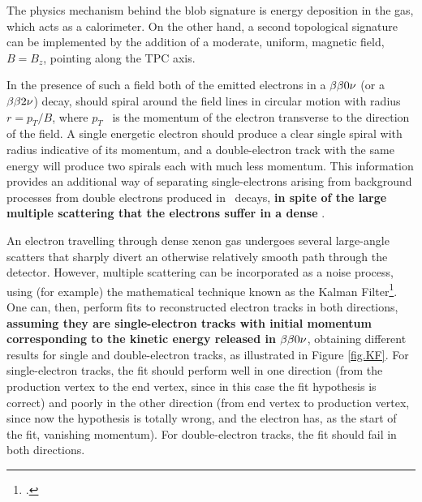 The physics mechanism behind the blob signature is energy deposition in the gas, which acts as a calorimeter. On the other hand, a second topological signature can be implemented by the addition of a moderate, uniform, magnetic field, $B= B_z$, pointing along the TPC axis. 

In the presence of such a field both of the emitted electrons in a $\beta\beta0\nu$ (or a $\beta\beta2\nu$) decay, should spiral around the field lines in circular motion with radius $r = p_T/B$, where $p_T$~ is the momentum of the electron transverse to the direction of the field. A single energetic electron should produce a clear single spiral with radius indicative of its momentum, and a double-electron track with the same energy will produce two spirals each with much less momentum. This information provides an additional way of separating single-electrons arising from background processes from double electrons produced in \bb\ decays, {\bf in spite of the large multiple scattering that the electrons suffer in a dense \HPXE}.

An electron travelling through dense xenon gas undergoes several large-angle scatters that sharply divert an otherwise relatively smooth path through the detector. However, multiple scattering can be incorporated as a noise process, using (for example) the mathematical technique known as the Kalman Filter\footcite{Cervera:2002}. One can, then, perform fits to reconstructed electron tracks in both directions, {\bf assuming they are single-electron tracks with initial momentum corresponding to the kinetic energy released in $\beta\beta0\nu$},  obtaining different results for single and double-electron tracks, as illustrated in Figure \ref{fig.KF}. For single-electron tracks, the fit should perform well in one direction (from the production vertex to the end vertex, since in this case the fit hypothesis is correct) and poorly in the other direction (from end vertex to production vertex, since now the hypothesis is totally wrong, and the electron has, as the start of the fit, vanishing momentum). For double-electron tracks, the fit should fail in both directions. 

